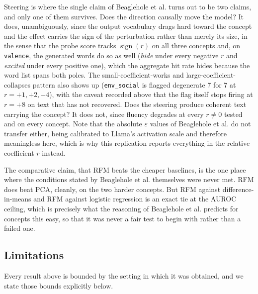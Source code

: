 Steering is where the single claim of Beaglehole et al. turns out to be two claims, and
only one of them survives. Does the direction causally move the model? It does,
unambiguously, since the output vocabulary drags hard toward the concept and the effect
carries the sign of the perturbation rather than merely its size, in the sense that the
probe score tracks $\operatorname{sign}(r)$ on all three concepts and, on \verb|valence|,
the generated words do so as well (\emph{hide} under every negative $r$ and
\emph{excited} under every positive one), which the aggregate hit rate hides because the
word list spans both poles. The small-coefficient-works and large-coefficient-collapses
pattern also shows up (\verb|env_social| is flagged degenerate 7 for 7 at
$r = +1, +2, +4$), with the caveat recorded above that the flag itself stops firing at
$r = +8$ on text that has not recovered. Does the steering produce coherent text carrying
the concept? It does not, since fluency degrades at every $r \neq 0$ tested and on every
concept. Note that the absolute $\varepsilon$ values of Beaglehole et al. do not transfer
either, being calibrated to Llama's activation scale and therefore meaningless here, which
is why this replication reports everything in the relative coefficient $r$ instead.

The comparative claim, that RFM beats the cheaper baselines, is the one place where the
conditions stated by Beaglehole et al. themselves were never met. RFM does beat PCA,
cleanly, on the two harder concepts. But RFM against difference-in-means and RFM against
logistic regression is an exact tie at the AUROC ceiling, which is precisely what the
reasoning of Beaglehole et al. predicts for concepts this easy, so that it was never a
fair test to begin with rather than a failed one.

\subsection{Limitations}

Every result above is bounded by the setting in which it was obtained, and we state those
bounds explicitly below.

